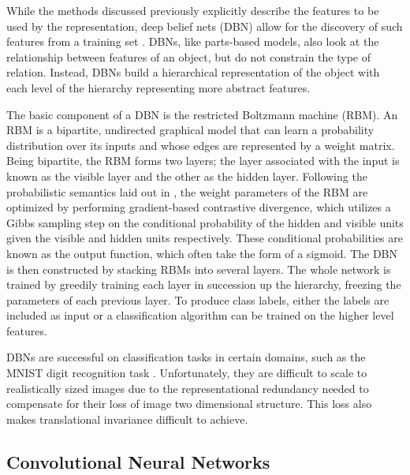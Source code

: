 \documentclass[10pt,twocolumn,letterpaper]{article}
\begin{document}
While the methods discussed previously explicitly describe the features to be used
by the representation, deep belief nets (DBN) allow for the discovery of such features
from a training set \cite{HintonDBN} \cite{CDBN}.
DBNs, like parts-based models, also look at the relationship between features of an object,
but do not constrain the type of relation.
Instead, DBNs build a hierarchical representation of the object with each level of the hierarchy
representing more abstract features.

The basic component of a DBN is the restricted Boltzmann machine (RBM).
An RBM is a bipartite, undirected graphical model that can learn a probability distribution
over its inputs and whose edges are represented by a weight matrix.
Being bipartite, the RBM forms two layers; the layer associated with the input is known
as the visible layer and the other as the hidden layer.
Following the probabilistic semantics laid out in \cite{CDBN}, the weight parameters of the RBM
are optimized by performing gradient-based contrastive divergence, which utilizes a
Gibbs sampling step on the conditional probability of the hidden and visible units given
the visible and hidden units respectively.
These conditional probabilities are known as the output function, which often take the form of a sigmoid.
The DBN is then constructed by stacking RBMs into several layers.
The whole network is trained by greedily training each layer in succession up the hierarchy,
freezing the parameters of each previous layer.
To produce class labels, either the labels are included as input or a classification algorithm
can be trained on the higher level features.

DBNs are successful on classification tasks in certain domains, such as the MNIST digit recognition
task \cite{HintonDBN}. Unfortunately, they are difficult to scale to realistically sized images
due to the representational redundancy needed to compensate for their loss of image
two dimensional structure. This loss also makes translational invariance difficult to achieve.

\subsection{Convolutional Neural Networks}
\end{document}
